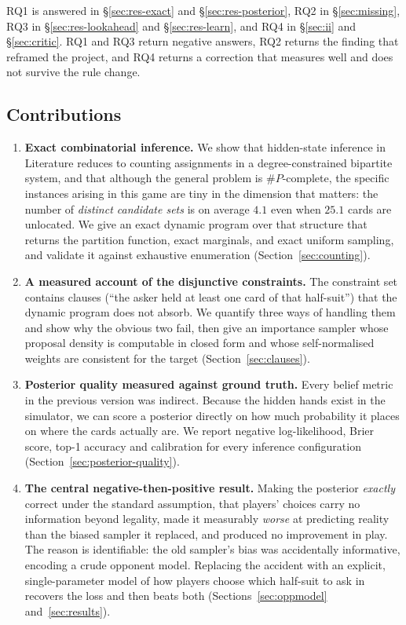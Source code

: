\documentclass[11pt,letterpaper]{article}
\begin{document}
\noindent RQ1 is answered in \S\ref{sec:res-exact} and
\S\ref{sec:res-posterior}, RQ2 in \S\ref{sec:missing}, RQ3 in
\S\ref{sec:res-lookahead} and \S\ref{sec:res-learn}, and RQ4 in
\S\ref{sec:ii} and \S\ref{sec:critic}. RQ1 and RQ3 return negative answers,
RQ2 returns the finding that reframed the project, and RQ4 returns a
correction that measures well and does not survive the rule change.

\subsection{Contributions}
\label{sec:contributions}

\begin{enumerate}
\item \textbf{Exact combinatorial inference.} We show that hidden-state
inference in Literature reduces to counting assignments in a
degree-constrained bipartite system, and that although the general problem is
$\#P$-complete, the specific instances arising in this game are tiny in the
dimension that matters: the number of \emph{distinct candidate sets} is on
average $4.1$ even when $25.1$ cards are unlocated. We give an exact dynamic
program over that structure that returns the partition function, exact
marginals, and exact uniform sampling, and validate it against exhaustive
enumeration (Section~\ref{sec:counting}).

\item \textbf{A measured account of the disjunctive constraints.} The
constraint set contains clauses (``the asker held at least one card of that
half-suit'') that the dynamic program does not absorb. We quantify three ways
of handling them and show why the obvious two fail, then give an importance
sampler whose proposal density is computable in closed form and whose
self-normalised weights are consistent for the target
(Section~\ref{sec:clauses}).

\item \textbf{Posterior quality measured against ground truth.} Every belief
metric in the previous version was indirect. Because the hidden hands exist in
the simulator, we can score a posterior directly on how much probability it
places on where the cards actually are. We report negative log-likelihood,
Brier score, top-1 accuracy and calibration for every inference configuration
(Section~\ref{sec:posterior-quality}).

\item \textbf{The central negative-then-positive result.} Making the posterior
\emph{exactly} correct under the standard assumption, that players' choices
carry no information beyond legality, made it measurably \emph{worse} at
predicting reality than the biased sampler it replaced, and produced no
improvement in play. The reason is identifiable: the old sampler's bias was
accidentally informative, encoding a crude opponent model. Replacing the
accident with an explicit, single-parameter model of how players choose which
half-suit to ask in recovers the loss and then beats both
(Sections~\ref{sec:oppmodel} and~\ref{sec:results}).


\end{enumerate}
\end{document}
